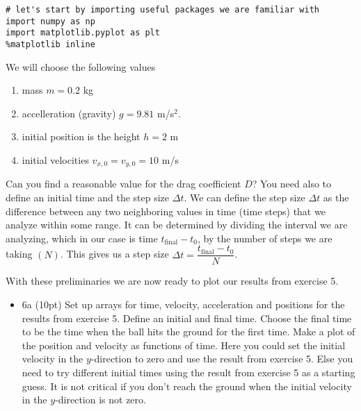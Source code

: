 \documentclass[%
oneside,                 %
final,                   %
10pt]{article}
\begin{document}
\noindent





\begin{verbatim}
# let's start by importing useful packages we are familiar with
import numpy as np
import matplotlib.pyplot as plt
%matplotlib inline

\end{verbatim}


We will choose the following values
\begin{enumerate}
\item mass $m=0.2$ kg

\item accelleration (gravity) $g=9.81$ m/s$^{2}$.

\item initial position is the height $h=2$ m

\item initial velocities $v_{x,0}=v_{y,0}=10$ m/s
\end{enumerate}

\noindent
Can you find a reasonable value for the drag coefficient $D$?
You need also to define an initial time and 
the step size $\Delta t$. We can define the step size $\Delta t$ as the difference between any
two neighboring values in time (time steps) that we analyze within
some range. It can be determined by dividing the interval we are
analyzing, which in our case is time $t_{\mathrm{final}}-t_0$, by the number of steps we
are taking $(N)$. This gives us a step size $\Delta t = \dfrac{t_{\mathrm{final}}-t_0}{N}$.

With these preliminaries we are now ready to plot our results from exercise 5.

\begin{itemize}
\item 6a (10pt) Set up arrays for time, velocity, acceleration and positions for the results from exercise 5. Define an initial and final time. Choose the final time to be the time when the ball hits the ground for the first time. Make a plot of the position and velocity as functions of time.  Here you could set the initial velocity in the $y$-direction to zero and use the result from exercise 5. Else you need to try different initial times using the result from exercise 5 as a starting guess.  It is not critical if you don't reach the ground when the initial velocity in the $y$-direction is not zero.
\end{itemize}
\end{document}
